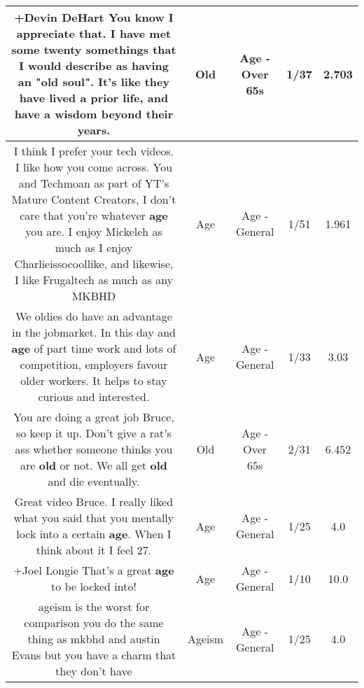 \documentclass[11pt]{article}
\newlength\mylength
\begin{document}
\begin{center}
\begin{longtable}{|C{.65\mylength}|C{.30\mylength}|C{.12\mylength}|C{.12\mylength}|C{.12\mylength}|}
  \small +Devin DeHart You know I appreciate  that. I have met some twenty somethings that I would describe as having an "\textbf{old} soul". It's like they have lived a prior life, and have a wisdom  beyond their years.\normalsize   & Old & Age - Over 65s & 1/37 & 2.703 \\  \hline
  \small I think I prefer your tech videos. I like how you come across. You and Techmoan as part of YT's Mature Content Creators, I don't care that you're whatever \textbf{age} you are. I enjoy Mickeleh as much as I enjoy Charlieissocoollike, and likewise, I like Frugaltech as much as any MKBHD\normalsize   & Age & Age - General & 1/51 & 1.961 \\  \hline
  \small We oldies do have an advantage in the  jobmarket. In this day and \textbf{age} of part time work and lots of competition, employers favour older workers. It helps to stay curious and interested.\normalsize   & Age & Age - General & 1/33 & 3.03 \\  \hline
  \small You are doing a great job Bruce, so keep it up. Don't give a rat's ass whether someone thinks you are \textbf{old} or not.  We all get \textbf{old} and die eventually.\normalsize   & Old & Age - Over 65s & 2/31 & 6.452 \\  \hline
  \small Great video Bruce.  I really liked what you said that you mentally lock into a certain \textbf{age}.  When I think about it I feel 27.\normalsize   & Age & Age - General & 1/25 & 4.0 \\  \hline
  \small +Joel Longie That's a great \textbf{age} to be locked into!\normalsize   & Age & Age - General & 1/10 & 10.0 \\  \hline
  \small ageism is the worst for comparison you do the same thing as mkbhd and austin Evans but you have a charm that they don't have\normalsize   & Ageism & Age - General & 1/25 & 4.0 \\  \hline
  
\end{longtable}
\end{center}
\end{document}
